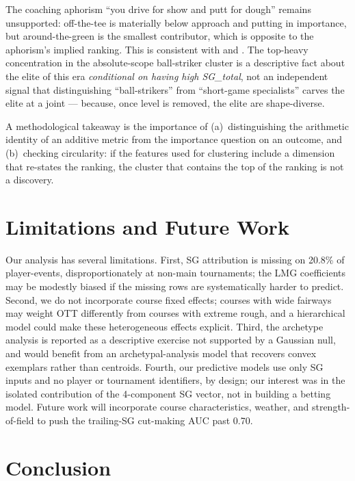 \documentclass[11pt]{article}
\begin{document}
The coaching aphorism ``you drive for show and putt for dough'' remains unsupported: off-the-tee is materially below approach and putting in importance, but around-the-green is the smallest contributor, which is opposite to the aphorism's implied ranking.  This is consistent with \citet{fearing2011golf} and \citet{broadie2012assessing}.  The top-heavy concentration in the absolute-scope ball-striker cluster is a descriptive fact about the elite of this era \emph{conditional on having high SG\_total}, not an independent signal that distinguishing ``ball-strikers'' from ``short-game specialists'' carves the elite at a joint --- because, once level is removed, the elite are shape-diverse.

A methodological takeaway is the importance of (a)~distinguishing the arithmetic identity of an additive metric from the importance question on an outcome, and (b)~checking circularity: if the features used for clustering include a dimension that re-states the ranking, the cluster that contains the top of the ranking is not a discovery.

\section{Limitations and Future Work}

Our analysis has several limitations.  First, SG attribution is missing on 20.8\% of player-events, disproportionately at non-main tournaments; the LMG coefficients may be modestly biased if the missing rows are systematically harder to predict.  Second, we do not incorporate course fixed effects; courses with wide fairways may weight OTT differently from courses with extreme rough, and a hierarchical model could make these heterogeneous effects explicit.  Third, the archetype analysis is reported as a descriptive exercise not supported by a Gaussian null, and would benefit from an archetypal-analysis model \citep{cutler1994archetypal} that recovers convex exemplars rather than centroids.  Fourth, our predictive models use only SG inputs and no player or tournament identifiers, by design; our interest was in the isolated contribution of the 4-component SG vector, not in building a betting model.  Future work will incorporate course characteristics, weather, and strength-of-field to push the trailing-SG cut-making AUC past 0.70.

\section{Conclusion}
\end{document}
